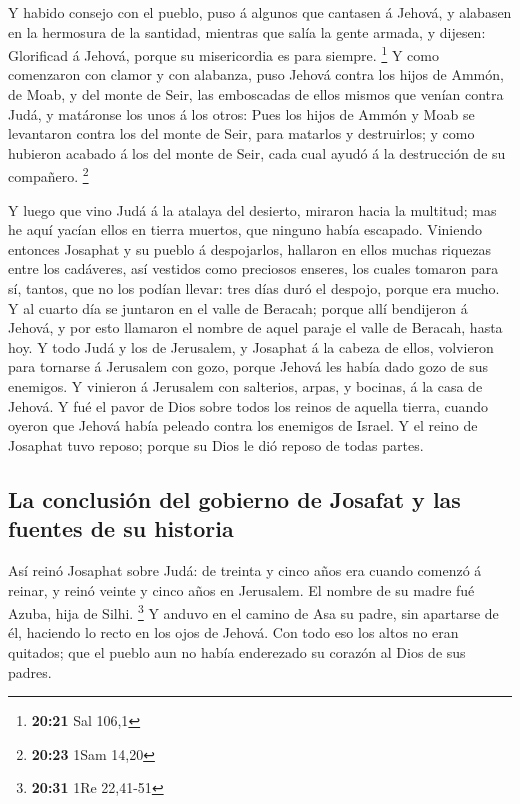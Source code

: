  Y habido consejo con el pueblo, puso á algunos que
cantasen á Jehová, y alabasen en la hermosura de la santidad, mientras
que salía la gente armada, y dijesen: Glorificad á Jehová, porque su
misericordia es para siempre. \footnote{\textbf{20:21} Sal 106,1}
 Y como comenzaron con clamor y con alabanza, puso Jehová
contra los hijos de Ammón, de Moab, y del monte de Seir, las emboscadas
de ellos mismos que venían contra Judá, y matáronse los unos á los
otros:  Pues los hijos de Ammón y Moab se levantaron contra
los del monte de Seir, para matarlos y destruirlos; y como hubieron
acabado á los del monte de Seir, cada cual ayudó á la destrucción de su
compañero. \footnote{\textbf{20:23} 1Sam 14,20}

 Y luego que vino Judá á la atalaya del desierto, miraron
hacia la multitud; mas he aquí yacían ellos en tierra muertos, que
ninguno había escapado.  Viniendo entonces Josaphat y su
pueblo á despojarlos, hallaron en ellos muchas riquezas entre los
cadáveres, así vestidos como preciosos enseres, los cuales tomaron para
sí, tantos, que no los podían llevar: tres días duró el despojo, porque
era mucho.  Y al cuarto día se juntaron en el valle de
Beracah; porque allí bendijeron á Jehová, y por esto llamaron el nombre
de aquel paraje el valle de Beracah, hasta hoy.  Y todo
Judá y los de Jerusalem, y Josaphat á la cabeza de ellos, volvieron para
tornarse á Jerusalem con gozo, porque Jehová les había dado gozo de sus
enemigos.  Y vinieron á Jerusalem con salterios, arpas, y
bocinas, á la casa de Jehová.  Y fué el pavor de Dios sobre
todos los reinos de aquella tierra, cuando oyeron que Jehová había
peleado contra los enemigos de Israel.  Y el reino de
Josaphat tuvo reposo; porque su Dios le dió reposo de todas partes.

\hypertarget{la-conclusiuxf3n-del-gobierno-de-josafat-y-las-fuentes-de-su-historia}{%
\subsection{La conclusión del gobierno de Josafat y las fuentes de su
historia}\label{la-conclusiuxf3n-del-gobierno-de-josafat-y-las-fuentes-de-su-historia}}

 Así reinó Josaphat sobre Judá: de treinta y cinco años era
cuando comenzó á reinar, y reinó veinte y cinco años en Jerusalem. El
nombre de su madre fué Azuba, hija de Silhi. \footnote{\textbf{20:31}
  1Re 22,41-51}  Y anduvo en el camino de Asa su padre, sin
apartarse de él, haciendo lo recto en los ojos de Jehová. 
Con todo eso los altos no eran quitados; que el pueblo aun no había
enderezado su corazón al Dios de sus padres.

